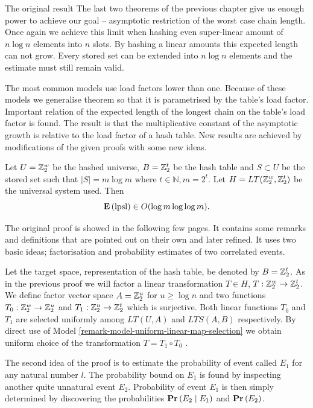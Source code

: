 \begin{section}{The original result}
The last two theorems of the previous chapter give us enough power to achieve our goal -- asymptotic restriction of the worst case chain length. Once again we achieve this limit when hashing even super-linear amount of $n \log n$ elements into $n$ slots. By hashing a linear amounts this expected length can not grow. Every stored set can be extended into $n \log n$ elements and the estimate must still remain valid. 

The most common models use load factors lower than one. Because of these models we generalise theorem so that it is parametrised by the table's load factor. Important relation of the expected length of the longest chain on the table's load factor is found. The result is that the multiplicative constant of the asymptotic growth is relative to the load factor of a hash table. New results are achieved by modifications of the given proofs with some new ideas.

\begin{theorem}
\label{theorem-n-logn-to-n}
Let $U = \mathbb{Z}_{2}^{w}$ be the hashed universe, $B = \mathbb{Z}_{2}^{t}$ be the hash table and $S \subset U$ be the stored set such that $|S| = m \log m$ where $t \in \mathbb{N}, m = 2 ^ t$. Let $H = LT(\mathbb{Z}_{2}^{w}, \mathbb{Z}_{2}^{t})$ be the universal system used. Then 
\[
	\mathbf{E}\left(\mathrm{lpsl}\right) \in O(\log m \log \log m) \text{.}
\]
\end{theorem}
The original proof is showed in the following few pages. It contains some remarks and definitions that are pointed out on their own and later refined. It uses two basic ideas; factorisation and probability estimates of two correlated events.

Let the target space, representation of the hash table, be denoted by $B = \mathbb{Z}_{2}^{t}$. As in the previous proof we will factor a linear transformation $T \in H$, $T: \mathbb{Z}_{2}^{w} \rightarrow \mathbb{Z}_{2}^{t}$. We define factor vector space $A = \mathbb{Z}_{2}^{u}$ for $u \geq \log n$ and two functions $T_0: \mathbb{Z}_{2}^{w} \rightarrow \mathbb{Z}_{2}^{u}$ and $T_1: \mathbb{Z}_{2}^{u} \rightarrow \mathbb{Z}_{2}^{t}$ which is surjective. Both linear functions $T_0$ and $T_1$ are selected uniformly among $LT(U, A)$ and $LTS(A, B)$ respectively. By direct use of Model \ref{remark-model-uniform-linear-map-selection} we obtain uniform choice of the transformation $T = T_1 \circ T_0$ .

The second idea of the proof is to estimate the probability of event called $E_1$ for any natural number $l$. The probability bound on $E_1$ is found by inspecting another quite unnatural event $E_2$. Probability of event $E_1$ is then simply determined by discovering the probabilities $\mathbf{Pr}\left(E_2 \mid E_1\right)$ and $\mathbf{Pr}\left(E_2\right)$.


\end{section}
